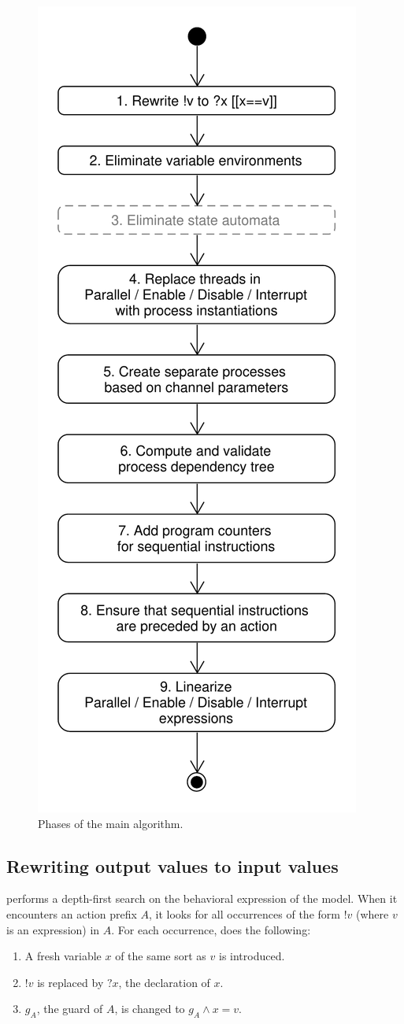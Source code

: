 \begin{figure}[!ht]
\begin{center}
\includegraphics[width=0.5\linewidth]{umlet/linearization-main-flow}
\caption{Phases of the main algorithm.}
\label{main-flow:fig}
\end{center}
\end{figure}

\begin{samepage}
\section{Rewriting output values to input values}

\lpeq{} performs a depth-first search on the behavioral expression of the model.
When it encounters an action prefix $A$, it looks for all occurrences of the form $\texttt{!}v$ (where $v$ is an expression) in $A$.
For each occurrence, \lpeq{} does the following:
\begin{enumerate}[1.]
\item A fresh variable $x$ of the same sort as $v$ is introduced.
\item $\texttt{!}v$ is replaced by $\texttt{?}x$, the declaration of $x$.
\item $g_A$, the guard of $A$, is changed to $g_A \land x = v$.
\end{enumerate}
\end{samepage}

